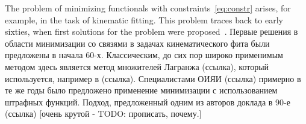 The problem of minimizing functionals with constraints~\eqref{eq:constr} arises, for example, in the task of kinematic fitting. This problem traces back to early sixties, when first solutions for the problem were proposed~\cite{b1,b2}.
Первые решения в области минимизации со связями в задачах кинематического фита были предложены в начала 60-х. Классическим, до сих пор широко применимым методом здесь является метод множителей Лагранжа (ссылка), который используется, например в (ссылка). Специалистами ОИЯИ (ссылка) примерно в те же годы было предложено применение минимизации с использованием штрафных функций.
Подход, предложенный одним из авторов доклада в 90-е (ссылка) [очень крутой - TODO: прописать, почему.]
